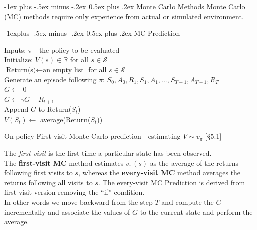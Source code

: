 \documentclass[10pt,landscape]{article}
\makeatletter
\renewcommand{\section}{\@startsection{section}{1}{0mm}%
                                {-1ex plus -.5ex minus -.2ex}%
                                {0.5ex plus .2ex}%
                                {\normalfont\large\bfseries}}
\renewcommand{\subsection}{\@startsection{subsection}{2}{0mm}%
                                {-1explus -.5ex minus -.2ex}%
                                {0.5ex plus .2ex}%
                                {\normalfont\normalsize\bfseries}}
\makeatother
\begin{document}
\begin{multicols}{3}

\section{Monte Carlo Methods}
Monte Carlo (MC) methods require only experience from actual or simulated environment.

\subsection{MC Prediction}
\begin{algorithm}[H]
Inputs: $\pi$ - the policy to be evaluated \\
Initialize: $V(s) \in \mathbb{R}$ for all $s \in \mathcal{S}$ \\
$\text{Return(s)} \leftarrow \text{an empty list}$ for all $s \in \mathcal{S}$ \\
{
    Generate an episode following $\pi$: $S_0, A_0, R_1, S_1, A_1,..., S_{T-1}, A_{T-1}, R_T$\\
    $G \leftarrow$ 0 \\
    {
    	$G \leftarrow \gamma G + R_{t+1}$\\
        {
        	Append $G$ to Return($S_t$)\\
        	$V(S_t) \leftarrow$ average(Return($S_t$))
        }
    }
 }
\caption{On-policy First-visit Monte Carlo prediction - estimating $V \sim v_{\pi}$ [§5.1]}
\end{algorithm}
The \emph{first-visit} is the first time a particular state has been observed.\\		
The \textbf{ﬁrst-visit MC} method estimates $v_{\pi}(s)$ as the average of the returns following ﬁrst visits to $s$, whereas the \textbf{every-visit MC} method averages the returns following all visits to $s$.
The every-visit MC Prediction is derived from first-visit version removing the ``if'' condition. \\
In other words we move backward from the step $T$ and compute the $G$ incrementally and associate the values of $G$ to the current state and perform the average.


\end{multicols}
\end{document}
